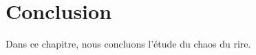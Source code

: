 \documentclass[12pt,space=onehalf,version=final]{yathesis}
\begin{document}
\chapter{Conclusion}
Dans ce chapitre, nous concluons l'étude du chaos du rire.
%
%
%
\end{document}
